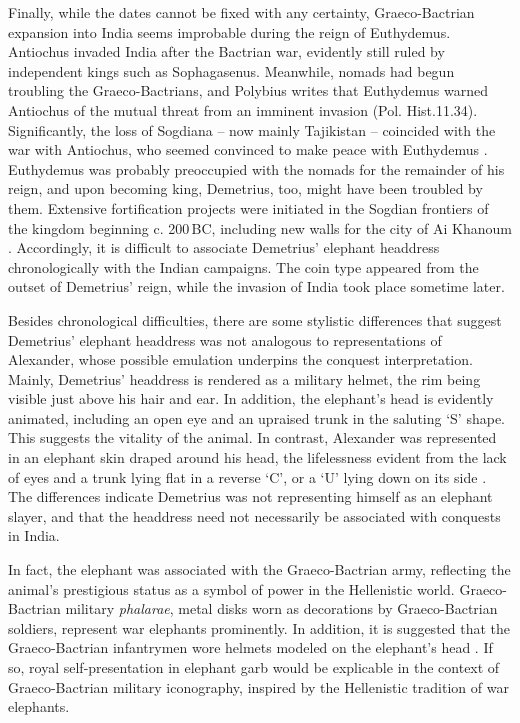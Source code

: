 \documentclass{ijsra}
\renewcommand\BC{{\,BC\xspace}}
\begin{document}
Finally, while the dates cannot be fixed with any certainty, Graeco-Bactrian expansion into India seems improbable during the reign of Euthydemus.
Antiochus invaded India after the Bactrian war, evidently still ruled by independent kings such as Sophagasenus.
Meanwhile, nomads had begun troubling the Graeco-Bactrians, and Polybius writes that Euthydemus warned Antiochus of the mutual threat from an imminent invasion (Pol. Hist.11.34).
Significantly, the loss of Sogdiana – now mainly Tajikistan – coincided with the war with Antiochus, who seemed convinced to make peace with Euthydemus \parencites[38--39]{Holt1981}[135]{Holt1999}.
Euthydemus was probably preoccupied with the nomads for the remainder of his reign, and upon becoming king, Demetrius, too, might have been troubled by them.
Extensive fortification projects were initiated in the Sogdian frontiers of the kingdom beginning c. 200\BC, including new walls for the city of Ai Khanoum \parencites[38--39]{Holt1981}[135]{Holt1999}[60--61]{Lerner1999}[236]{Widemann2000}.
Accordingly, it is difficult to associate Demetrius’ elephant headdress chronologically with the Indian campaigns.
The coin type appeared from the outset of Demetrius’ reign, while the invasion of India took place sometime later.

Besides chronological difficulties, there are some stylistic differences that suggest Demetrius’ elephant headdress was not analogous to representations of Alexander, whose possible emulation underpins the conquest interpretation.
Mainly, Demetrius’ headdress is rendered as a military helmet, the rim being visible just above his hair and ear.
In addition, the elephant’s head is evidently animated, including an open eye and an upraised trunk in the saluting ‘S’ shape.
This suggests the vitality of the animal.
In contrast, Alexander was represented in an elephant skin draped around his head,
the lifelessness evident from the lack of eyes and a trunk lying flat in
a reverse ‘C’, or a ‘U’ lying down on its side \parencites[11]{Dahmen2007}[37]{Marcinkiewicz-Joseph2016}[48]{Maritz2004}[63]{Smith1986}.
The differences indicate Demetrius was not representing himself as an elephant slayer, and that the headdress need not necessarily be associated with conquests in India. 

In fact, the elephant was associated with the Graeco-Bactrian army, reflecting the animal’s prestigious status as a symbol of power in the Hellenistic world.
Graeco-Bactrian military \emph{phalarae}, metal disks worn as decorations by Graeco-Bactrian soldiers, represent war elephants prominently.
In addition, it is suggested that the Graeco-Bactrian infantrymen wore helmets modeled on the elephant’s head \parencites[170]{Abduallaev1995}[1206-1211]{Bannikov2013}[9--10]{Pfrommer1993}[588]{Treister1999}.
If so, royal self-presentation in elephant garb would be explicable in the context of Graeco-Bactrian military iconography, inspired by the Hellenistic tradition of war elephants.
\end{document}
